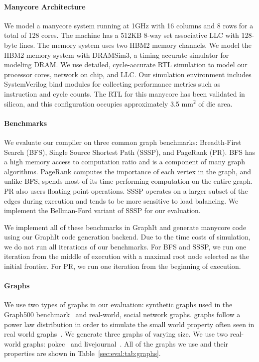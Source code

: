 \paragraph{Manycore Architecture}
We model a manycore system running at 1GHz with 16 columns and 8 rows for a total of 128 cores.
The machine has a 512KB 8-way set associative LLC with 128-byte lines.
The memory system uses two HBM2 memory channels.
We model the HBM2 memory system with DRAMSim3\cite{li2019dramsim3},  a timing accurate simulator for modeling DRAM.
We use detailed, cycle-accurate RTL simulation to model our processor cores, network on chip, and LLC.
Our simulation environment includes SystemVerilog bind modules for collecting performance metrics such as instruction and cycle counts.
The RTL for this manycore has been validated in silicon, and this configuration occupies approximately 3.5 mm$^2$ of die area. 

\paragraph{Benchmarks} We evaluate our compiler on three common graph benchmarks: Breadth-First Search (BFS), Single Source Shortest Path (SSSP), and PageRank (PR). 
BFS has a high memory access to computation ratio and is a component of many graph algorithms.
PageRank computes the importance of each vertex in the graph, and unlike BFS, spends most of its time performing computation on the entire graph.
PR also users floating point operations.
SSSP operates on a larger subset of the edges during execution and tends to be more sensitive to load balancing.
We implement the Bellman-Ford variant of SSSP for our evaluation.

We implement all of these benchmarks in GraphIt and generate manycore code using our GraphIt code generation backend.
Due to the time costs of simulation, we do not run all iterations of our benchmarks. 
For BFS and SSSP, we run one iteration from the middle of execution with a maximal root node selected as the initial frontier.
For PR, we run one iteration from the beginning of execution.



\paragraph{Graphs} We use two types of graphs in our evaluation: synthetic \kron graphs used in the Graph500 benchmark~\cite{murphy2010graph500} and real-world, social network graphs.
\kron graphs follow a power law distribution in order to simulate the small world property often seen in real world graphs~\cite{leskovec2010kronecker}.
We generate three \kron graphs of varying size. 
We use two real-world graphs: pokec~\cite{pokec} and livejournal~\cite{lj}.
All of the graphs we use and their properties are shown in Table~\ref{sec:eval:tab:graphs}.



